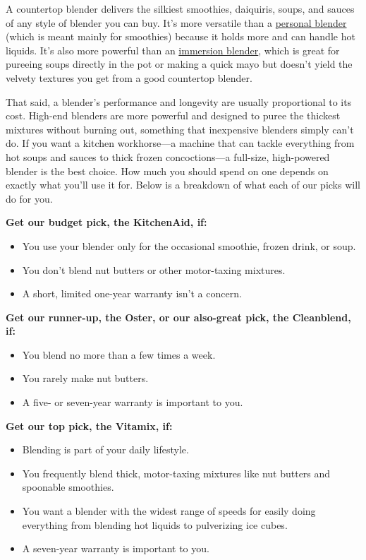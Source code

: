 A countertop blender delivers the silkiest smoothies, daiquiris, soups,
and sauces of any style of blender you can buy. It's more versatile than
a
\href{https://www.nytimes3xbfgragh.onion/wirecutter/reviews/best-personal-blender/}{personal
blender} (which is meant mainly for smoothies) because it holds more and
can handle hot liquids. It's also more powerful than an
\href{https://www.nytimes3xbfgragh.onion/wirecutter/reviews/best-immersion-blender/}{immersion
blender}, which is great for pureeing soups directly in the pot or
making a quick mayo but doesn't yield the velvety textures you get from
a good countertop blender.

That said, a blender's performance and longevity are usually
proportional to its cost. High-end blenders are more powerful and
designed to puree the thickest mixtures without burning out, something
that inexpensive blenders simply can't do. If you want a kitchen
workhorse---a machine that can tackle everything from hot soups and
sauces to thick frozen concoctions---a full-size, high-powered blender
is the best choice. How much you should spend on one depends on exactly
what you'll use it for. Below is a breakdown of what each of our picks
will do for you.

\textbf{Get our budget pick, the KitchenAid, if:}

\begin{itemize}
\tightlist
\item
  You use your blender only for the occasional smoothie, frozen drink,
  or soup.
\item
  You don't blend nut butters or other motor-taxing mixtures.
\item
  A short, limited one-year warranty isn't a concern.
\end{itemize}

\textbf{Get our runner-up, the Oster, or our also-great pick, the
Cleanblend, if:}

\begin{itemize}
\tightlist
\item
  You blend no more than a few times a week.
\item
  You rarely make nut butters.
\item
  A five- or seven-year warranty is important to you.
\end{itemize}

\textbf{Get our top pick, the Vitamix, if:}

\begin{itemize}
\tightlist
\item
  Blending is part of your daily lifestyle.
\item
  You frequently blend thick, motor-taxing mixtures like nut butters and
  spoonable smoothies.
\item
  You want a blender with the widest range of speeds for easily doing
  everything from blending hot liquids to pulverizing ice cubes.
\item
  A seven-year warranty is important to you.
\end{itemize}

